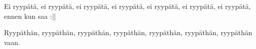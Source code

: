 	
\beginverse*						
Ei ryypätä, ei ryypätä, ei ryypätä, ei ryypätä,
ei ryypätä, ei ryypätä, ei ryypätä, 
ennen kun saa :||
\endverse						

\beginverse				
Ryypäthän, ryypäthän, ryypäthän, ryypäthän,
ryypäthän, ryypäthän, 
ryypäthän vaan.
\endverse		
\endsong		
